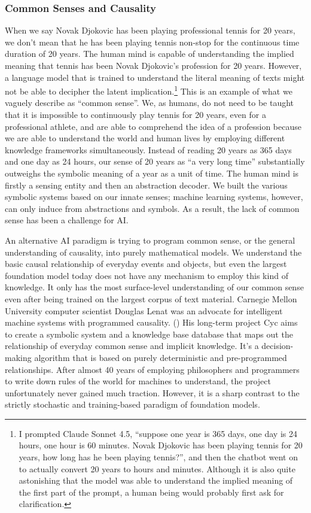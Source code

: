 \documentclass[12pt]{article}
\begin{document}
\subsubsection{Common Senses and Causality}
When we say Novak Djokovic has been playing professional tennis for 20 years, we don't mean that he has been playing tennis non-stop for the continuous time duration of 20 years. The human mind is capable of understanding the implied meaning that tennis has been Novak Djokovic's profession for 20 years. However, a language model that is trained to understand the literal meaning of texts might not be able to decipher the latent implication.\footnote{I prompted Claude Sonnet 4.5, ``suppose one year is 365 days, one day is 24 hours, one hour is 60 minutes. Novak Djokovic has been playing tennis for 20 years, how long has he been playing tennis?'', and then the chatbot went on to actually convert 20 years to hours and minutes. Although it is also quite astonishing that the model was able to understand the implied meaning of the first part of the prompt, a human being would probably first ask for clarification.} This is an example of what we vaguely describe as ``common sense''. We, as humans, do not need to be taught that it is impossible to continuously play tennis for 20 years, even for a professional athlete, and are able to comprehend the idea of a profession because we are able to understand the world and human lives by employing different knowledge frameworks simultaneously. Instead of reading 20 years as 365 days and one day as 24 hours, our sense of 20 years as ``a very long time'' substantially outweighs the symbolic meaning of a year as a unit of time. The human mind is firstly a sensing entity and then an abstraction decoder. We built the various symbolic systems based on our innate senses; machine learning systems, however, can only induce from abstractions and symbols. As a result, the lack of common sense has been a challenge for AI.

An alternative AI paradigm is trying to program common sense, or the general understanding of causality, into purely mathematical models. We understand the basic causal relationship of everyday events and objects, but even the largest foundation model today does not have any mechanism to employ this kind of knowledge. It only has the most surface-level understanding of our common sense even after being trained on the largest corpus of text material. Carnegie Mellon University computer scientist Douglas Lenat was an advocate for intelligent machine systems with programmed causality. (\cite{LENAT1984269}) His long-term project Cyc aims to create a symbolic system and a knowledge base database that maps out the relationship of everyday common sense and implicit knowledge. It's a decision-making algorithm that is based on purely deterministic and pre-programmed relationships. After almost 40 years of employing philosophers and programmers to write down rules of the world for machines to understand, the project unfortunately never gained much traction. However, it is a sharp contrast to the strictly stochastic and training-based paradigm of foundation models. 
\end{document}
